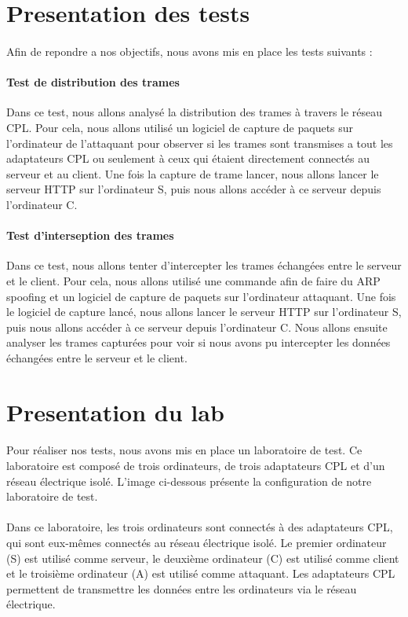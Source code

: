\documentclass[a4paper,twocolumn]{report}
\begin{document}
\section{Presentation des tests}
\paragraph{}Afin de repondre a nos objectifs, nous avons mis en place les tests suivants :
\paragraph{Test de distribution des trames} Dans ce test, nous allons analysé la distribution des trames à travers le réseau CPL. Pour cela, nous allons utilisé un logiciel de capture de paquets sur l'ordinateur de l'attaquant pour observer si les trames sont transmises a tout les adaptateurs CPL ou seulement à ceux qui étaient directement connectés au serveur et au client. Une fois la capture de trame lancer, nous allons lancer le serveur HTTP sur l'ordinateur S, puis nous allons accéder à ce serveur depuis l'ordinateur C. 

\paragraph{Test d'interseption des trames} Dans ce test, nous allons tenter d'intercepter les trames échangées entre le serveur et le client. Pour cela, nous allons utilisé une commande afin de faire du ARP spoofing et un logiciel de capture de paquets sur l'ordinateur attaquant. Une fois le logiciel de capture lancé, nous allons lancer le serveur HTTP sur l'ordinateur S, puis nous allons accéder à ce serveur depuis l'ordinateur C. Nous allons ensuite analyser les trames capturées pour voir si nous avons pu intercepter les données échangées entre le serveur et le client.

\section{Presentation du lab}
\paragraph{}Pour réaliser nos tests, nous avons mis en place un laboratoire de test. Ce laboratoire est composé de trois ordinateurs, de trois adaptateurs CPL et d'un réseau électrique isolé. L'image ci-dessous présente la configuration de notre laboratoire de test.
\paragraph{}Dans ce laboratoire, les trois ordinateurs sont connectés à des adaptateurs CPL, qui sont eux-mêmes connectés au réseau électrique isolé. Le premier ordinateur (S) est utilisé comme serveur, le deuxième ordinateur (C) est utilisé comme client et le troisième ordinateur (A) est utilisé comme attaquant. Les adaptateurs CPL permettent de transmettre les données entre les ordinateurs via le réseau électrique.
\end{document}

